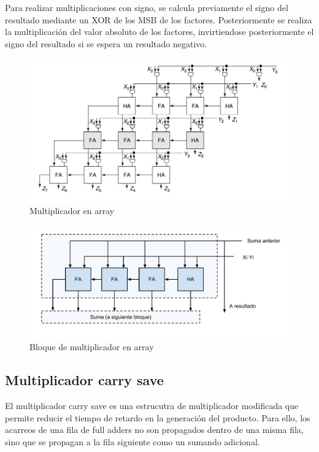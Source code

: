 \documentclass[a4paper,12pt]{article}
\begin{document}
Para realizar multiplicaciones con signo, se calcula previamente el signo del resultado mediante un XOR de los MSB de los factores. Posteriormente se realiza la multiplicación del valor absoluto de los factores, invirtiendose posteriormente el signo del resultado si se espera un resultado negativo.

\begin{figure}[hbt]
\includegraphics[width=\textwidth]{img/array_multiplier.png} 
\caption{Multiplicador en array} \label{fig:array_multiplier}
\end{figure}

\begin{figure}[hbt]
\includegraphics[width=\textwidth]{img/array_mult_block.pdf} 
\caption{Bloque de multiplicador en array} \label{fig:array_multiplier_block}
\end{figure}

\clearpage
\subsection{Multiplicador carry save}
El multiplicador carry save es una estrucutra de multiplicador modificada que permite reducir el tiempo de retardo en la generación del producto. Para ello, los acarreos de una fila de full adders no son propagados dentro de una misma fila, sino que se propagan a la fila siguiente como un sumando adicional.
\end{document}
